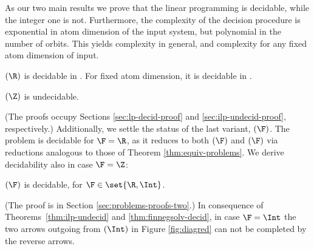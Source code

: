 As our two main results we prove that the linear programming is decidable, while the integer one is not.
Furthermore, the complexity of the decision procedure is exponential in atom dimension of the input system,
but polynomial in the number of orbits. 
This yields \EXPTIME complexity in general, and \PTIME complexity for any fixed atom dimension
of input. 
%
\begin{theorem} \label{thm:lp-decid}
\finineqsolvname$(\R)$
is decidable in \EXPTIME.
For fixed atom dimension, it is decidable in \PTIME.
\end{theorem} 
%
\begin{theorem} \label{thm:ilp-undecid}
\finineqsolvname$(\Z)$
is undecidable.
\end{theorem} 
%
(The proofs %
occupy Sections \ref{sec:lp-decid-proof} and
\ref{sec:ilp-undecid-proof}, respectively.)
%
Additionally, we settle the status of the last variant, \finnonnegsolvname$(\F)$.
The problem is decidable for $\F=\R$, as it reduces to both \finineqsolvname$(\F)$ and 
\nonnegsolvname$(\F)$ via reductions analogous to those of Theorem 
\ref{thm:equiv-problems}. We derive decidability also in case $\F = \Z$:

%
\begin{theorem} \label{thm:finnegsolv-decid}
\finnonnegsolvname$(\F)$ is decidable, for $\F\in\set{\R,\Int}$. 
\end{theorem}
%
\noindent
(The proof is in Section \ref{sec:problems-proofs-two}.)
In consequence of  Theorems~\ref{thm:ilp-undecid} and \ref{thm:finnegsolv-decid}, in case $\F = \Int$
the two arrows outgoing from \finnonnegsolvname$(\Int)$ in Figure \ref{fig:diagred} can
not be completed by the reverse arrows.



